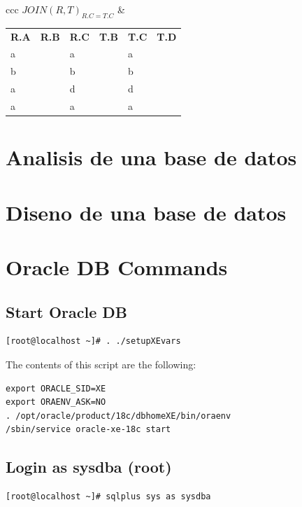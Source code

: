 \documentclass[twoside]{article}
\begin{document}
\begin{center}
\begin{tabular}{ccc}
\tabularnewline
$JOIN(R, T)_{R.C = T.C}$ \Rightarrow
&
\begin{minipage}{.25\linewidth}
\begin{tabular}{| >{\centering}m{1cm}| >{\centering}m{1cm}| >{\centering}m{1cm}| >{\centering}m{1cm}| >{\centering}m{1cm}| >{\centering}m{1cm}|}
\hline
\multicolumn{6}{|c|}{\textbf{Resultado}}
\tabularnewline \hline
\textbf{R.A}
&
\textbf{R.B}
&
\textbf{R.C}
&
\textbf{T.B}
&
\textbf{T.C}
&
\textbf{T.D}
\tabularnewline \hline
a & 1 & a & 1 & a & 1
\tabularnewline \hline
b & 1 & b & 3 & b & 1
\tabularnewline \hline
a & 1 & d & 1 & d & 4
\tabularnewline \hline
a & 1 & a & 2 & a & 3
\tabularnewline \hline
\end{tabular}
\end{minipage}
\end{tabular}
\end{center}

\section{Analisis de una base de datos}
\section{Diseno de una base de datos}


\section{Oracle DB Commands}

\subsection{Start Oracle DB}

\begin{verbatim}
[root@localhost ~]# . ./setupXEvars
\end{verbatim}
The contents of this script are the following:

\begin{verbatim}
export ORACLE_SID=XE
export ORAENV_ASK=NO
. /opt/oracle/product/18c/dbhomeXE/bin/oraenv
/sbin/service oracle-xe-18c start
\end{verbatim}

\subsection{Login as sysdba (root)}
\begin{verbatim}
[root@localhost ~]# sqlplus sys as sysdba
\end{verbatim}
\end{document}
